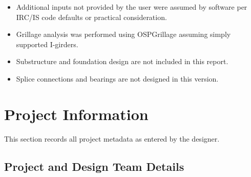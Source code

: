 \documentclass[12pt,a4paper]{report}
\numberwithin{table}{chapter}
\numberwithin{figure}{chapter}
\begin{document}
\begin{itemize}
\item Additional inputs not provided by the user were assumed by software per IRC/IS code defaults or practical consideration.
\item Grillage analysis was performed using OSPGrillage assuming simply supported I-girders.
\item Substructure and foundation design are not included in this report.
\item Splice connections and bearings are not designed in this version.
\end{itemize}

\titleformat{\chapter}[block]{\normalfont\Large\bfseries\centering}{\thechapter}{1em}{}
\titlespacing*{\chapter}{0pt}{-30pt}{10pt}


\chapter{Project Information}

This section records all project metadata as entered by the designer.

\section{Project and Design Team Details}
\label{sec:project-details}
\end{document}
